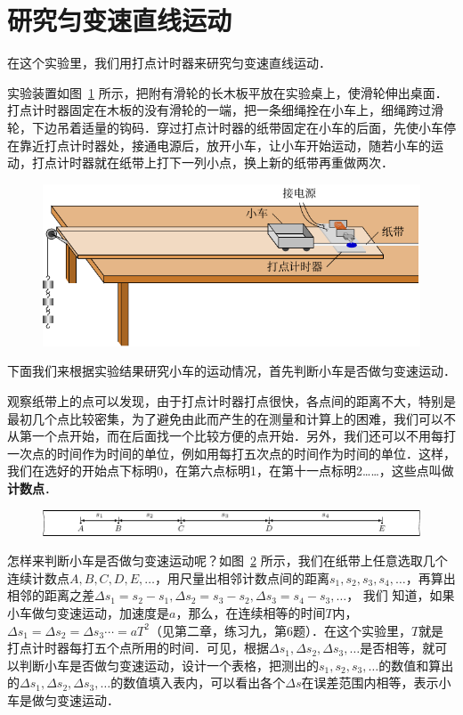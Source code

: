 \section{研究匀变速直线运动}
在这个实验里，我们用打点计时器来研究匀变速直线运动．

实验装置如图~\ref{fig_A_10-9} 所示，把附有滑轮的长木板平放在实验桌上，使滑轮伸出桌面．打点计时器固定在木板的没有滑轮的一端，把一条细绳拴在小车上，细绳跨过滑轮，下边吊着适量的钩码．穿过打点计时器的纸带固定在小车的后面，先使小车停在靠近打点计时器处，接通电源后，放开小车，让小车开始运动，随若小车的运动，打点计时器就在纸带上打下一列小点，换上新的纸带再重做两次．	
\begin{figure}[htbp]
    \centering
    \includegraphics{fig/A/10-9.pdf}
    \caption{}\label{fig_A_10-9}
\end{figure}

下面我们来根据实验结果研究小车的运动情况，首先判断小车是否做匀变速运动．

观察纸带上的点可以发现，由于打点计时器打点很快，各点间的距离不大，特别是最初几个点比较密集，为了避免由此而产生的在测量和计算上的困难，我们可以不从第一个点开始，而在后面找一个比较方便的点开始．另外，我们还可以不用每打一次点的时间作为时间的单位，例如用每打五次点的时间作为时间的单位．这样，我们在选好的开始点下标明0，在第六点标明1，在第十一点标明2……，这些点叫做\textbf{计数点}．

\begin{figure}[htbp]
    \centering
    \includegraphics{fig/A/10-10.pdf}
    \caption{}\label{fig_A_10-10}
\end{figure}
    

怎样来判断小车是否做匀变速运动呢？如图~\ref{fig_A_10-10} 所示，我们在纸带上任意选取几个连续计数点$A,B,C,D,E,\ldots$，用尺量出相邻计数点间的距离$s_1,s_2,s_3,s_4,\ldots$，再算出相邻的距离之差$\Delta s_1=s_2-s_1, \Delta s_2=s_3-s_2,\Delta s_3=s_4-s_3,\ldots$， 我们	
知道，如果小车做匀变速运动，加速度是$a$，那么，在连续相等的时间$T$内，$\Delta s_1=\Delta s_2=\Delta s_3\cdots=aT^2$（见第二章，练习九，第6题）．在这个实验里，$T$就是打点计时器每打五个点所用的时间．可见，根据$\Delta s_1,\Delta s_2,\Delta s_3,\ldots$是否相等，就可以判断小车是否做匀变速运动，设计一个表格，把测出的$s_1,s_2,s_3,\ldots$的数值和算出的$\Delta s_1,\Delta s_2,\Delta s_3,\ldots$的数值填入表内，可以看出各个$\Delta s$在误差范围内相等，表示小车是做匀变速运动．


